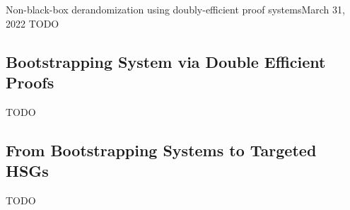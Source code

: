 \begin{lecture}{10}{Non-black-box derandomization using doubly-efficient proof
  systems}{March 31, 2022}
TODO

\subsection{Bootstrapping System via Double Efficient Proofs}
TODO

\subsection{From Bootstrapping Systems to Targeted HSGs}
TODO

\end{lecture}
